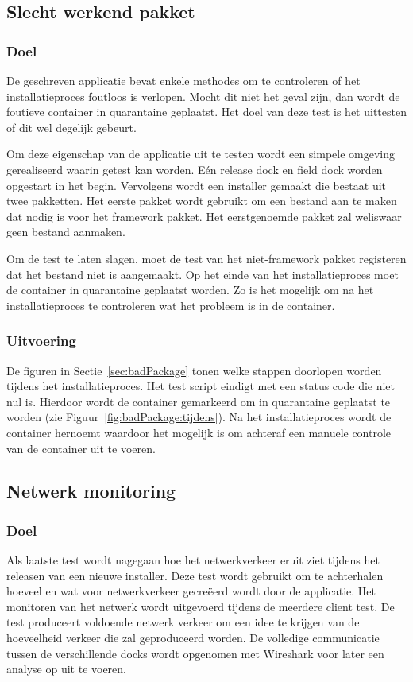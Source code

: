 \subsection{Slecht werkend pakket}
\subsubsection{Doel}
De geschreven applicatie bevat enkele methodes om te controleren of het installatieproces foutloos is verlopen.
Mocht dit niet het geval zijn, dan wordt de foutieve container in quarantaine geplaatst.
Het doel van deze test is het uittesten of dit wel degelijk gebeurt.

Om deze eigenschap van de applicatie uit te testen wordt een simpele omgeving gerealiseerd waarin getest kan worden.
Eén release dock en field dock worden opgestart in het begin.
Vervolgens wordt een installer gemaakt die bestaat uit twee pakketten.
Het eerste pakket wordt gebruikt om een bestand aan te maken dat nodig is voor het framework pakket.
Het eerstgenoemde pakket zal weliswaar geen bestand aanmaken.

Om de test te laten slagen, moet de test van het niet-framework pakket registeren dat het bestand niet is aangemaakt.
Op het einde van het installatieproces moet de container in quarantaine geplaatst worden.
Zo is het mogelijk om na het installatieproces te controleren wat het probleem is in de container.

\subsubsection{Uitvoering}
De figuren in Sectie~\ref{sec:badPackage} tonen welke stappen doorlopen worden tijdens het installatieproces.
Het test script eindigt met een status code die niet nul is.
Hierdoor wordt de container gemarkeerd om in quarantaine geplaatst te worden (zie Figuur~\ref{fig:badPackage:tijdens}).
Na het installatieproces wordt de container hernoemt waardoor het mogelijk is om achteraf een manuele controle van de container uit te voeren.

\subsection{Netwerk monitoring}
\subsubsection{Doel}
Als laatste test wordt nagegaan hoe het netwerkverkeer eruit ziet tijdens het releasen van een nieuwe installer.
Deze test wordt gebruikt om te achterhalen hoeveel en wat voor netwerkverkeer gecreëerd wordt door de applicatie.
Het monitoren van het netwerk wordt uitgevoerd tijdens de meerdere client test.
De test produceert voldoende netwerk verkeer om een idee te krijgen van de hoeveelheid verkeer die zal geproduceerd worden.
De volledige communicatie tussen de verschillende docks wordt opgenomen met Wireshark voor later een analyse op uit te voeren.

